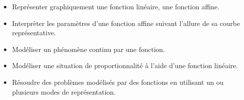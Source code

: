 \begin{prerequis}[Objectifs de 3\up{e}]    
    \begin{itemize}        
        \item Représenter graphiquement une fonction linéaire, une fonction affine.
        \item Interprèter les paramètres d’une fonction affine suivant l’allure de sa courbe représentative.
        \item Modéliser un phénomène continu par une fonction.
        \item Modéliser une situation de proportionnalité à l’aide d’une fonction linéaire.
        \item Résoudre des problèmes modélisés par des fonctions en utilisant un ou plusieurs modes de représentation.
    \end{itemize}
\end{prerequis}